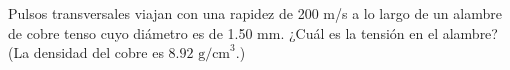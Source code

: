 \item Pulsos transversales viajan con una rapidez de 200 m/s a lo largo de un alambre de cobre tenso cuyo diámetro es de 1.50 mm. ¿Cuál es la tensión en el alambre? (La densidad del cobre es $8.92\text{ g/cm}^3$.)